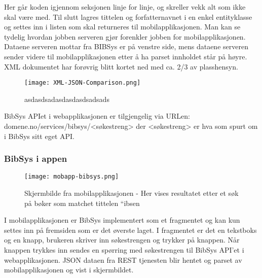 \documentclass[../main.tex]{subfiles}
\begin{document}
Her går koden igjennom seksjonen linje for linje, og skreller vekk alt som ikke skal være med. Til slutt lagres tittelen og forfatternavnet i en enkel entityklasse og settes inn i listen som skal returneres til mobilapplikasjonen.\newline
\newline
Man kan se tydelig hvordan jobben serveren gjør forenkler jobben for mobilapplikasjonen. Dataene serveren mottar fra BIBSys er på venstre side, mens dataene serveren sender videre til mobilapplikasjonen etter å ha parset innholdet står på høyre. XML dokumentet har forøvrig blitt kortet ned med ca. 2/3  av plasshensyn.

\begin{figure}[H]
  \centering
  \texttt{[image: XML-JSON-Comparison.png]}
  \caption{asdasdsadasdasdasdsadsads}
\end{figure}

BibSys APIet i webapplikasjonen er tilgjengelig via URLen: domene.no/services/bibsys/<søkestreng> der <søkestreng> er hva som spurt om i BibSys sitt eget API.

\subsubsection{BibSys i appen}

\begin{figure}[H]
  \centering
  \texttt{[image: mobapp-bibsys.png]}
  \caption{Skjermbilde fra mobilapplikasjonen - Her vises resultatet etter et søk på bøker som matchet tittelen “ibsen}
\end{figure}

I mobilapplikasjonen er BibSys implementert som et fragmentet og kan kun settes inn på fremsiden som er det øverste laget. I fragmentet er det en tekstboks og en knapp, brukeren skriver inn søkestrengen og trykker på knappen. Når knappen trykkes inn sendes en spørring med søkestrengen til BibSys API’et i webapplikasjonen. JSON dataen fra REST tjenesten blir hentet og parset av mobilapplikasjonen og vist i skjermbildet.

\newpage
\end{document}
